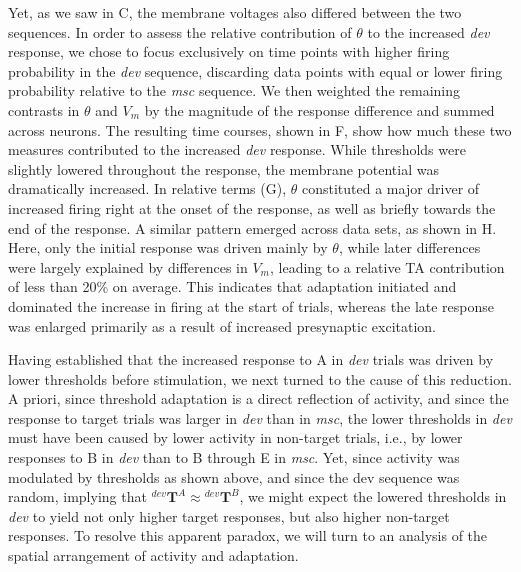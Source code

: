 \documentclass[9pt,lineno,onehalfspacing]{elife}
\newcommand{\dev}{\textit{dev}}
\newcommand{\msc}{\textit{msc}}
\newcommand{\T}[3][]{{}^{#1}_{}\boldsymbol T^{#2}_{#3}}
\begin{document}
Yet, as we saw in C, the membrane voltages also differed between the two sequences. In order to assess the relative contribution of $\theta$ to the increased \dev{} response, we chose to focus exclusively on time points with higher firing probability in the \dev{} sequence, discarding data points with equal or lower firing probability relative to the \msc{} sequence. We then weighted the remaining contrasts in $\theta$ and $V_m$ by the magnitude of the response difference and summed across neurons. The resulting time courses, shown in F, show how much these two measures contributed to the increased \dev{} response. While thresholds were slightly lowered throughout the response, the membrane potential was dramatically increased. In relative terms (G), $\theta$ constituted a major driver of increased firing right at the onset of the response, as well as briefly towards the end of the response. A similar pattern emerged across data sets, as shown in H. Here, only the initial response was driven mainly by $\theta$, while later differences were largely explained by differences in $V_m$, leading to a relative TA contribution of less than 20\% on average. This indicates that adaptation initiated and dominated the increase in firing at the start of trials, whereas the late response was enlarged primarily as a result of increased presynaptic excitation.

Having established that the increased response to A in \dev{} trials was driven by lower thresholds before stimulation, we next turned to the cause of this reduction. A priori, since threshold adaptation is a direct reflection of activity, and since the response to target trials was larger in \dev{} than in \msc{}, the lower thresholds in \dev{} must have been caused by lower activity in non-target trials, i.e., by lower responses to B in \dev{} than to B through E in \msc{}. Yet, since activity was modulated by thresholds as shown above, and since the dev sequence was random, implying that $\T[dev]{A}{} \approx \T[dev]{B}{}$, we might expect the lowered thresholds in \dev{} to yield not only higher target responses, but also higher non-target responses. To resolve this apparent paradox, we will turn to an analysis of the spatial arrangement of activity and adaptation.
\end{document}
